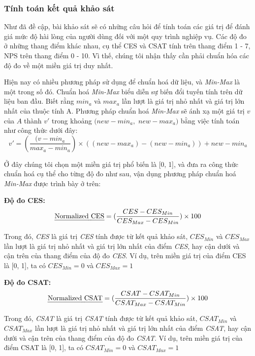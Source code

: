 \subsubsection{Tính toán kết quả khảo sát}
Như đã đề cập, bài khảo sát sẽ có những câu hỏi để tính toán các giá trị để đánh giá mức độ hài lòng của người dùng đối với một quy trình nghiệp vụ. Các độ đo ở những thang điểm khác nhau, cụ thể CES và CSAT tính trên thang điểm 1 - 7, NPS trên thang điểm 0 - 10. Vì thế, chúng tôi nhận thấy cần phải chuẩn hóa các độ đo về một miền giá trị duy nhất. 
\par
Hiện nay có nhiều phương pháp sử dụng để chuẩn hoá dữ liệu, và \emph{Min-Max} là một trong số đó. Chuẩn hoá \emph{Min-Max} biểu diễn sự biến đổi tuyến tính trên dữ liệu ban đầu. Biết rằng $min_a$ và $max_a$ lần lượt là giá trị nhỏ nhất và giá trị lớn nhất của thuộc tính A. Phương pháp chuẩn hoá \emph{Min-Max} sẽ ánh xạ một giá trị $v$ của $A$ thành $v'$ trong khoảng $(new-min_a,$ $new-max_a)$ bằng việc tính toán như công thức dưới đây:
\[ v' = (\frac{(v - min_a}{max_a - min_a}) \times ((new-max_a) - (new-min_a)) + new-min_a\]

Ở đây chúng tôi chọn một miền giá trị phổ biến là [0, 1], và đưa ra công thức chuẩn hoá cụ thể cho từng độ đo như sau, vận dụng phương pháp chuẩn hoá \emph{Min-Max} được trình bày ở trên:

\textbf{Độ đo CES:}
\[ \text{\emph{Normalized CES}} = (\frac{CES - CES_{Min}}{CES_{Max} - CES_{Min}}) \times 100\]
\par
Trong đó, \emph{CES} là giá trị \emph{CES} tính được từ kết quả khảo sát, $CES_{Min}$ và $CES_{Max}$ lần lượt là giá trị nhỏ nhất và giá trị lớn nhất của điểm \emph{CES}, hay cận dưới và cận trên của thang điểm của độ đo \emph{CES}. Ví dụ, trên miền giá trị của điểm CES là [0, 1], ta có $CES_{Min} = 0$ và $CES_{Max} = 1$

\textbf{Độ đo CSAT:}
\[ \text{\emph{Normalized CSAT}} = (\frac{CSAT - CSAT_{Min}}{CSAT_{Max} - CSAT_{Min}}) \times 100\]
\par
Trong đó, \emph{CSAT} là giá trị \emph{CSAT} tính được từ kết quả khảo sát, $CSAT_{Min}$ và $CSAT_{Max}$ lần lượt là giá trị nhỏ nhất và giá trị lớn nhất của điểm \emph{CSAT}, hay cận dưới và cận trên của thang điểm của độ đo \emph{CSAT}. Ví dụ, trên miền giá trị của điểm CSAT là [0, 1], ta có $CSAT_{Min} = 0$ và $CSAT_{Max} = 1$

